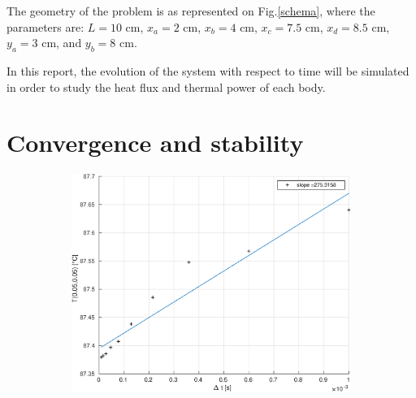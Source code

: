 \documentclass[a4paper,12pt,twoside]{article}
\begin{document}
The geometry of the problem is as represented on Fig.\ref{schema}, where the parameters are: $L=10$ cm, $x_a=2$ cm, $x_b=4$ cm, $x_c=7.5$ cm, $x_d=8.5$ cm, $y_a=3$ cm, and $y_b=8$ cm.

In this report, the evolution of the system with respect to time will be simulated in order to study the heat flux and thermal power of each body.


\section{Convergence and stability}

\begin{figure}[h]
  \centering
  \begin{subfigure}[t]{0.45\textwidth}
    \includegraphics[width=\textwidth]{graphs/b_conv40.eps}


\end{subfigure}
\end{figure}
\end{document}
